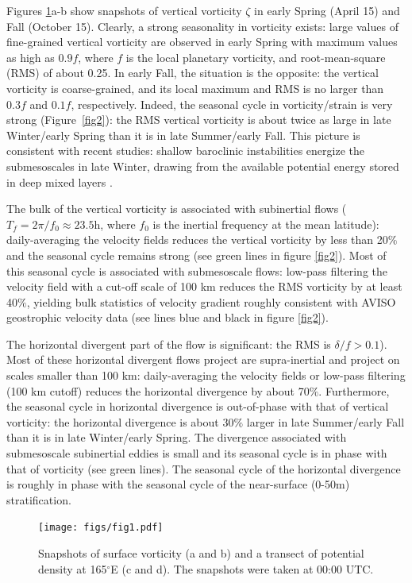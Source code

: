 \documentclass[grl]{agutex2015}
\begin{document}
\begin{article}
Figures \ref{fig1}a-b show snapshots of vertical vorticity $\zeta$ in early Spring
(April 15) and Fall (October 15). Clearly, a strong seasonality in vorticity
exists: large values of fine-grained vertical vorticity are
observed in early Spring with maximum values as high as $0.9f$, where $f$ is
the local planetary vorticity, and root-mean-square (RMS) of about 0.25. In early
Fall, the situation is the opposite: the vertical vorticity is coarse-grained,
and its local maximum and RMS is no larger than $0.3f$ and $0.1f$, respectively.
Indeed, the seasonal cycle in vorticity/strain is very strong (Figure~\ref{fig2}):
the RMS vertical vorticity is about twice as large in late Winter/early Spring
than it is in late Summer/early Fall. This picture is consistent with
recent studies: shallow baroclinic instabilities energize the submesoscales
in late Winter, drawing from the available potential energy stored in deep mixed
layers \citep{sasaki_etal2014,callies_etal2015,callies_etal2016}.

The bulk of the vertical vorticity is associated with subinertial flows
($T_f = 2\pi/f_0\approx 23.5$h, where $f_0$ is the inertial frequency at
the mean latitude): daily-averaging the velocity fields reduces the vertical
vorticity by less than 20$\%$ and the seasonal cycle remains strong (see
green lines in figure \ref{fig2}). Most of this seasonal cycle is associated
with submesoscale flows: low-pass filtering the velocity field
with a cut-off scale of 100 km reduces the RMS vorticity by at least 40$\%$,
yielding bulk statistics of velocity gradient roughly consistent with AVISO
geostrophic velocity data (see lines blue and black in figure \ref{fig2}).

The horizontal divergent part of the flow is significant: the RMS is $\delta/f > 0.1$).
Most of these horizontal divergent flows project are supra-inertial and project
on scales smaller than 100 km: daily-averaging the velocity fields or low-pass
filtering (100 km cutoff) reduces the horizontal divergence by about 70$\%$.
Furthermore, the seasonal cycle in horizontal divergence is out-of-phase with that
of vertical vorticity: the horizontal divergence is about 30$\%$ larger in late
Summer/early Fall than it is in late Winter/early Spring. The divergence associated
with submesoscale subinertial eddies is small and its seasonal cycle is in phase
with that of vorticity (see green lines).  The seasonal cycle of the horizontal
divergence is roughly in phase with the seasonal cycle of the near-surface (0-50m)
stratification.
\begin{figure}[ht]
\begin{center}
\texttt{[image: figs/fig1.pdf]}
 \caption{Snapshots of surface vorticity (a and b) and a transect
          of potential density at 165$^\circ$E (c and d). The snapshots were
          taken at 00:00 UTC.}
 \label{fig1}
 \end{center}
 \end{figure}


\end{article}
\end{document}
